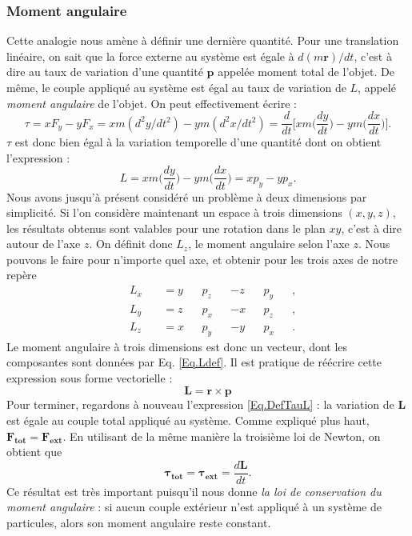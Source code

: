 \subsubsection{Moment angulaire}
Cette analogie nous amène à définir une dernière quantité. Pour une translation linéaire, on sait que la force externe au système est égale à $d(m\bm{r})/dt$, c'est à dire au taux de variation d'une quantité $\bm{p}$ appelée moment total de l'objet. De même, le couple appliqué au système est égal au taux de variation de $L$, appelé \textit{moment angulaire} de l'objet. On peut effectivement écrire :
\begin{equation}
\tau = xF_y-yF_x = xm(d^2y/dt^2)-ym(d^2x/dt^2) = \frac{d}{dt}\biggl[xm\biggl(\frac{dy}{dt}\biggr) - ym\biggl(\frac{dx}{dt}\biggr)\biggr].
\label{Eq.DefTauL}
\end{equation}
$\tau$ est donc bien égal à la variation temporelle d'une quantité dont on obtient l'expression :
\begin{equation*}
L = xm\biggl(\frac{dy}{dt}\biggr) - ym\biggl(\frac{dx}{dt}\biggr) = xp_y - yp_x.
\end{equation*}
Nous avons jusqu'à présent considéré un problème à deux dimensions par simplicité. Si l'on considère maintenant un espace à trois dimensions $(x,y,z)$, les résultats obtenus sont valables pour une rotation dans le plan $xy$, c'est à dire autour de l'axe $z$. On définit donc $L_z$, le moment angulaire selon l'axe $z$. Nous pouvons le faire pour n'importe quel axe, et obtenir pour les trois axes de notre repère
\begin{equation}
\begin{alignedat}{6}
&L_x~&&=y&&p_z&&-z&&p_y&&,\\
&L_y~&&=z&&p_x&&-x&&p_z&&,\\
&L_z~&&=x&&p_y&&-y&&p_x&&.
\end{alignedat}
\label{Eq.Ldef}
\end{equation}
Le moment angulaire à trois dimensions est donc un vecteur, dont les composantes sont données par Eq. \ref{Eq.Ldef}. Il est pratique de réécrire cette expression sous forme vectorielle :
\begin{equation*}
\bm{L}=\bm{r}\times\bm{p}
\end{equation*}
Pour terminer, regardons à nouveau l'expression \ref{Eq.DefTauL} : la variation de $\bm{L}$ est égale au couple total appliqué au système. Comme expliqué plus haut, $\bm{F_{tot}} = \bm{F_{ext}}$. En utilisant de la même manière la troisième loi de Newton, on obtient que 
\begin{equation*}
\bm{\tau_{tot}} = \bm{\tau_{ext}} = \frac{d\bm{L}}{dt}. 
\end{equation*}
Ce résultat est très important puisqu'il nous donne \textit{la loi de conservation du moment angulaire} : si aucun couple extérieur n'est appliqué à un système de particules, alors son moment angulaire reste constant.


